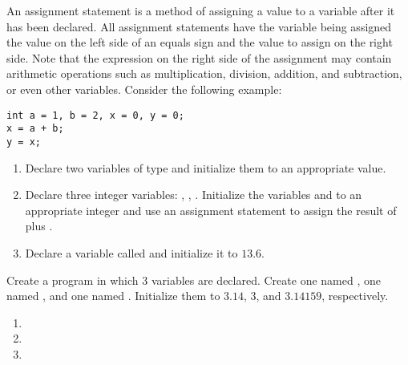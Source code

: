 
An assignment statement is a method of assigning a value to a variable after it has been declared.
All assignment statements have the variable being assigned the value on the left side of an equals sign and the value to assign on the right side.
Note that the expression on the right side of the assignment may contain arithmetic operations such as multiplication, division, addition, and subtraction, or even other variables.
Consider the following example:

\begin{lstlisting}
int a = 1, b = 2, x = 0, y = 0;
x = a + b;
y = x;
\end{lstlisting}




\begin{enumerate}
	\item Declare two variables of type  and initialize them to an appropriate value.
	\item Declare three integer variables: , , . Initialize the variables  and  to an appropriate integer and use an assignment statement to assign  the result of  plus .
	\item Declare a  variable called  and initialize it to $13.6$.
\end{enumerate}


Create a program in which 3 variables are declared.
Create one  named , one  named , and one  named .
Initialize them to $3.14$, $3$, and $3.14159$, respectively. 



\begin{enumerate}
	\item {}

	\item	{}
 
  \item {}
\end{enumerate}
	
